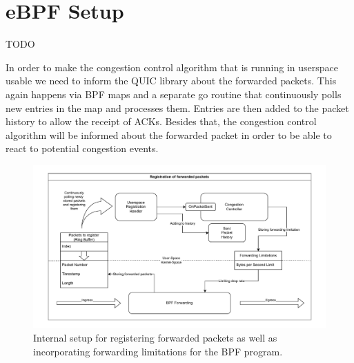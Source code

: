 \section{eBPF Setup}\label{sec:ebpf_setup}
TODO

In order to make the congestion control algorithm that is running in userspace
usable we need to inform the QUIC library about the forwarded packets.
This again happens via BPF maps and a separate go routine that continuously
polls new entries in the map and processes them.
Entries are then added to the packet history to allow the receipt of ACKs.
Besides that, the congestion control algorithm will be informed about the
forwarded packet in order to be able to react to potential congestion events.
\begin{figure}[htbp]
    \centering
    \includegraphics[width=\textwidth]{figures/03_fast_relays/forward-registration.drawio.pdf}
    \caption{Internal setup for registering forwarded packets as well as incorporating forwarding
    limitations for the BPF program.}\label{fig:ebpf-hooks}
\end{figure}